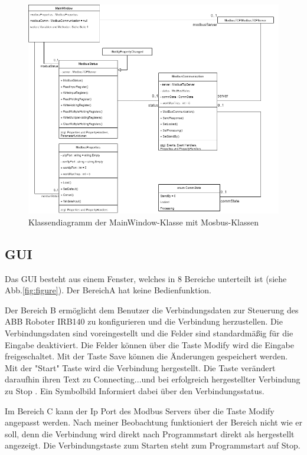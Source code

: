 \begin{figure}
    \caption[Klassendiagramm Modbus ]
    {\small Klassendiagramm der MainWindow-Klasse mit Mosbus-Klassen }\label{fig:figure4}
    \includegraphics[width = \textwidth ]{Bilder/LV_Klassendiagramm_Modbus}
    \centering
\end{figure}

\subsection{GUI}
Das GUI besteht aus einem Fenster, welches in 8 Bereiche unterteilt ist (siehe Abb.\ref{fig:figure}).
Der Bereich\glqq A \grqq hat keine Bedienfunktion.

Der Bereich \glqq B \grqq ermöglicht dem Benutzer die Verbindungsdaten zur Steuerung des ABB Roboter IRB140 zu
konfigurieren und die Verbindung herzustellen. Die Verbindungsdaten sind voreingestellt und die Felder sind
standardmäßig für die Eingabe deaktiviert. Die Felder können über die Taste \glqq Modify \grqq wird die Eingabe
freigeschaltet.
Mit der Taste \glqq Save \grqq können die Änderungen gespeichert werden.
Mit der \glqq "Start" \grqq Taste wird die Verbindung hergestellt.
Die Taste verändert daraufhin ihren Text zu \glqq Connecting...\grqq und bei erfolgreich hergestellter Verbindung
zu \glqq Stop \grqq.
Ein Symbolbild Informiert dabei über den Verbindungsstatus.

Im Bereich \glqq C \grqq kann der Ip Port des Modbus Servers über die Taste \glqq Modify \grqq angepasst werden.
Nach meiner Beobachtung funktioniert der Bereich nicht wie er soll, denn die Verbindung wird direkt nach Programmstart
direkt als hergestellt angezeigt.
Die Verbindungstaste zum Starten steht zum Programmstart auf \glqq Stop\grqq.

